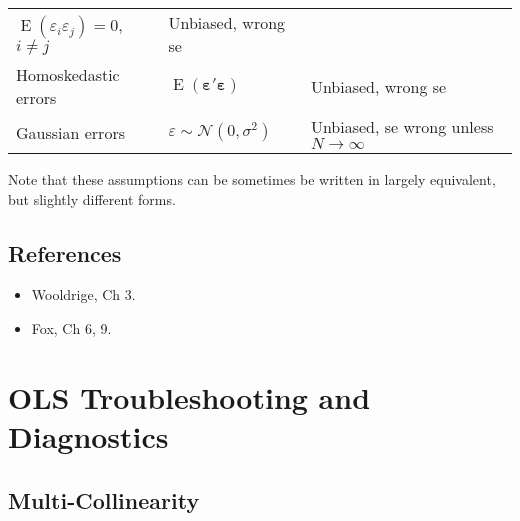 \documentclass[]{book}
\providecommand{\tightlist}{%
  \setlength{\itemsep}{0pt}\setlength{\parskip}{0pt}}
\DeclareMathOperator{\E}{E}
\renewcommand{\vec}[1]{\boldsymbol{#1}}
\renewcommand{\T}{'}
\newcommand{\distr}[1]{\mathcal{#1}}
\newcommand{\dnorm}{\distr{N}}
\begin{document}
\begin{longtable}[c]{@{}lll@{}}
\begin{minipage}[t]{0.27\columnwidth}
\(\E(\varepsilon_i \varepsilon_j) = 0\), \(i \neq j\)
\strut\end{minipage} &
\begin{minipage}[t]{0.32\columnwidth}\raggedright\strut
Unbiased, wrong se
\strut\end{minipage}\tabularnewline
\begin{minipage}[t]{0.27\columnwidth}\raggedright\strut
Homoskedastic errors
\strut\end{minipage} &
\begin{minipage}[t]{0.27\columnwidth}\raggedright\strut
\(\E(\vec{\varepsilon}\T \vec{\varepsilon})\)
\strut\end{minipage} &
\begin{minipage}[t]{0.32\columnwidth}\raggedright\strut
Unbiased, wrong se
\strut\end{minipage}\tabularnewline
\begin{minipage}[t]{0.27\columnwidth}\raggedright\strut
Gaussian errors
\strut\end{minipage} &
\begin{minipage}[t]{0.27\columnwidth}\raggedright\strut
\(\varepsilon \sim \dnorm(0, \sigma^2)\)
\strut\end{minipage} &
\begin{minipage}[t]{0.32\columnwidth}\raggedright\strut
Unbiased, se wrong unless \(N \to \infty\)
\strut\end{minipage}\tabularnewline
\bottomrule
\end{longtable}

Note that these assumptions can be sometimes be written in largely
equivalent, but slightly different forms.

\section{References}\label{references}

\begin{itemize}
\tightlist
\item
  Wooldrige, Ch 3.
\item
  Fox, Ch 6, 9.
\end{itemize}

\chapter{OLS Troubleshooting and
Diagnostics}\label{ols-troubleshooting-and-diagnostics}

\section{Multi-Collinearity}\label{multi-collinearity}
\end{document}
